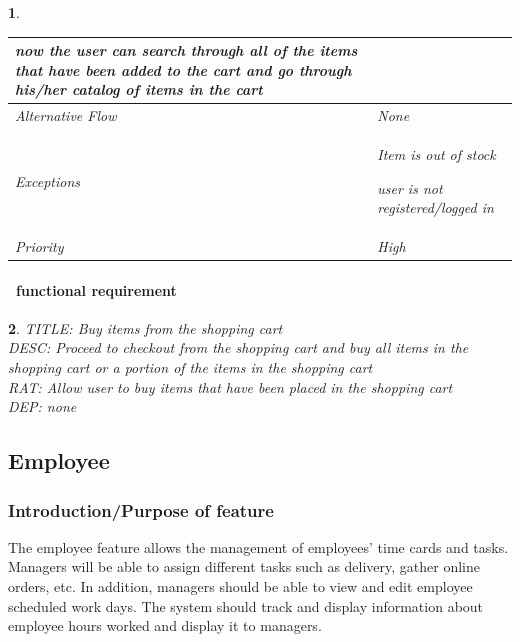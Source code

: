 \documentclass{scrreprt}
\theoremstyle{funreq}
\newtheorem{funreq}{}
\begin{document}
\begin{funreq}
\begin{table}[H]
{\begin{tabularx}{\columnwidth}{|l|X|}
					now the user can search through all of the items that have been added to the cart and go through his/her catalog of items in the cart \\ \hline
					Alternative Flow & None                                       \\ \hline
					Exceptions       & Item is out of stock
					
					user is not registered/logged in \\ \hline
					Priority         & High                                       \\ \hline
				\end{tabularx}%
			}
		\end{table}
	\end{funreq}

	
	\paragraph[]{\Subsectionname ~functional requirement }
	\begin{funreq}
		\label{card_buy}
		TITLE: Buy items from the shopping cart\\
		DESC: Proceed to checkout from the shopping cart and buy all items in the shopping cart or a portion of the items in the shopping cart\\
		RAT: Allow user to buy items that have been placed in the shopping cart\\
		DEP: none
	\end{funreq}
	
	
	\subsection{Employee}
	\subsubsection{Introduction/Purpose of feature}
	The employee feature allows the management of employees’ time cards and tasks. Managers will be able to assign different tasks such as delivery, gather online orders, etc.  In addition, managers should be able to view and edit employee scheduled work days.  The system should track and display information about employee hours worked and display it to managers.
	
\end{document}

